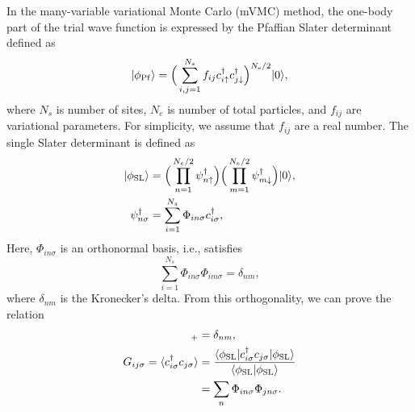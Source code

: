 In the many-variable variational Monte Carlo (mVMC) method,
the one-body part of the trial wave function is expressed by the Pfaffian Slater determinant defined as
\begin{equation}
|\phi_{\rm Pf}\rangle=\Big(\sum_{i,j=1}^{N_{s}}f_{ij}c_{i\uparrow}^{\dagger}c_{j\downarrow}^{\dagger}\Big)^{N_{\rm e}/2}|0\rangle,
\end{equation}
where $N_{s}$ is number of sites, $N_{e}$ is number of total particles, and $f_{ij}$ are variational parameters.
For simplicity, we assume that $f_{ij}$ are a real number.
The single Slater determinant is defined as 
\begin{align}
|\phi_{\rm SL}\rangle&=\Big(\prod_{n=1}^{N_{e}/2}\psi_{n\uparrow}^{\dagger}\Big)
\Big(\prod_{m=1}^{N_{e}/2}\psi_{m\downarrow}^{\dagger}\Big)|0\rangle, \\
\psi_{n\sigma}^{\dagger}&=\sum_{i=1}^{N_{s}}\Phi_{in\sigma}c^{\dagger}_{i\sigma},
\end{align}
Here, $\Phi_{in\sigma}$ is an orthonormal basis, i.e., satisfies
\begin{equation}
\sum_{i=1}^{N_{s}}\Phi_{in\sigma}\Phi_{im\sigma}=\delta_{nm},
\end{equation}
where $\delta_{nm}$ is the Kronecker's delta.
From this orthogonality, we can prove the relation
\begin{align}
[\psi^{\dagger}_{n\sigma},\psi_{m\sigma}]_{+}&=\delta_{nm},\\
G_{ij\sigma}=\langle c_{i\sigma}^{\dagger}c_{j\sigma}\rangle 
&=\frac{\langle \phi_{\rm SL}| c_{i\sigma}^{\dagger}c_{j\sigma} | \phi_{\rm SL}\rangle}{\langle \phi_{\rm SL}|\phi_{\rm SL}\rangle } \\
&=\sum_{n} \Phi_{in\sigma} \Phi_{jn\sigma}.
\end{align}

